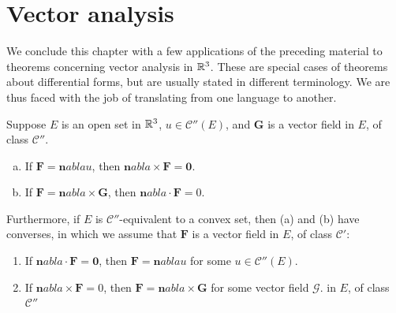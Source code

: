 
\section{Vector analysis}

We conclude this chapter with a few applications of the preceding material to theorems concerning vector analysis in ${\protect\mathbb R}^3$. 
These are special cases of theorems about differential forms, but are usually stated in different terminology. 
We are thus faced with the job of translating from one language to another.

\begin{mydef}

\end{mydef}

\begin{thm}
    \label{thm:10.43}
    Suppose $E$ is an open set in ${\protect\mathbb R}^3$, $u \in \mathscr{C}''(E)$, and $\mathbf{G}$ is a vector field in $E$, of class $\mathscr{C}''$.
    \begin{enumerate}[(a)]
        \item If $\mathbf{F} = \mathbf{n}abla u$, then $\mathbf{n}abla \times \mathbf{F} = \mathbf{0}$.
        \item If $\mathbf{F} = \mathbf{n}abla \times \mathbf{G}$, then $\mathbf{n}abla \cdot \mathbf{F} = 0$.
    \end{enumerate}

    Furthermore, if $E$ is $\mathscr{C}''$-equivalent to a convex set, 
    then (a) and (b) have converses, 
    in which we assume that $\mathbf{F}$ is a vector field in $E$, of class $\mathscr{C}'$:
    \begin{enumerate}[(a')]
        \item If $\mathbf{n}abla \cdot \mathbf{F} = \mathbf{0}$, then $\mathbf{F} = \mathbf{n}abla u$ for some $u \in \mathscr{C}''(E)$.
        \item If $\mathbf{n}abla \times \mathbf{F} = 0$, then $\mathbf{F} = \mathbf{n}abla \times \mathbf{G}$ for some vector field $\mathscr{G}$. in $E$, of class $\mathscr{C}''$
    \end{enumerate}
\end{thm}


